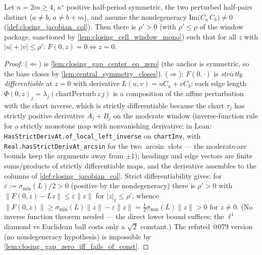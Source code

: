 \begin{lemma}\leanok
[$t=0$ closing rigidity at a nondegenerate symmetric anchor
  (corrected @080)]
  \label{lem:closure_boundary_rigidity}
  Let $n = 2m \ge 4$, $\kappa^s$ positive half-period symmetric, the two
  perturbed half-pairs distinct ($a \ne b$, $a \ne b + m$), and assume the
  nondegeneracy $\mathrm{Im}\bigl(\overline{C_a}\,C_b\bigr) \ne 0$
  (\cref{def:closing_jacobian_col}). Then there is $\rho' > 0$ (with
  $\rho' \le \rho$ of the window package, sanctioned by
  \cref{lem:closing_cell_window_mono}) such that for all $z$ with
  $|u| + |v| \le \rho'$: $F(0, z) = 0 \iff z = 0$.
\end{lemma}
\begin{proof}
        \leanok
  ($\Leftarrow$) is \cref{lem:closing_gap_center_eq_zero} (the anchor is
  symmetric, so the base closes by \cref{lem:central_symmetry_closes}).
  ($\Rightarrow$): $F(0, \cdot)$ is \emph{strictly differentiable} at $z = 0$
  with derivative $L(u,v) = u C_a + v C_b$: each edge length
  $\Phi(0,z)_j = \lambda_j(\mathrm{chartPerturb}\,z\,j)$ is a composition of
  the affine perturbation with the chart inverse, which is strictly
  differentiable because the chart $\tau_j$ has strictly positive derivative
  $A_j + B_j$ on the moderate window (inverse-function rule for a strictly
  monotone map with nonvanishing derivative; in Lean:
  \texttt{HasStrictDerivAt.of\_local\_left\_inverse} on
  \texttt{chartInv}, with \texttt{Real.hasStrictDerivAt\_arcsin} for the two
  $\arcsin$ slots --- the moderate-arc bounds keep the arguments away from
  $\pm1$); headings and edge vectors are finite sums/products of strictly
  differentiable maps, and the derivative assembles to the columns of
  \cref{def:closing_jacobian_col}. Strict differentiability gives: for
  $\varepsilon := \sigma_{\min}(L)/2 > 0$ (positive by the nondegeneracy)
  there is $\rho' > 0$ with
  $\|F(0,z) - L z\| \le \varepsilon \|z\|$ for $|z|_1 \le \rho'$, whence
  $\|F(0,z)\| \ge \sigma_{\min}(L)\|z\| - \varepsilon\|z\| =
  \tfrac12\sigma_{\min}(L)\|z\| > 0$ for $z \ne 0$. (No inverse function
  theorem needed --- the direct lower bound suffices; the $\ell^1$ diamond vs
  Euclidean ball costs only a $\sqrt2$ constant.) The refuted @079 version
  (no nondegeneracy hypothesis) is impossible by
  \cref{lem:closing_gap_zero_iff_fails_of_const}.
\end{proof}

